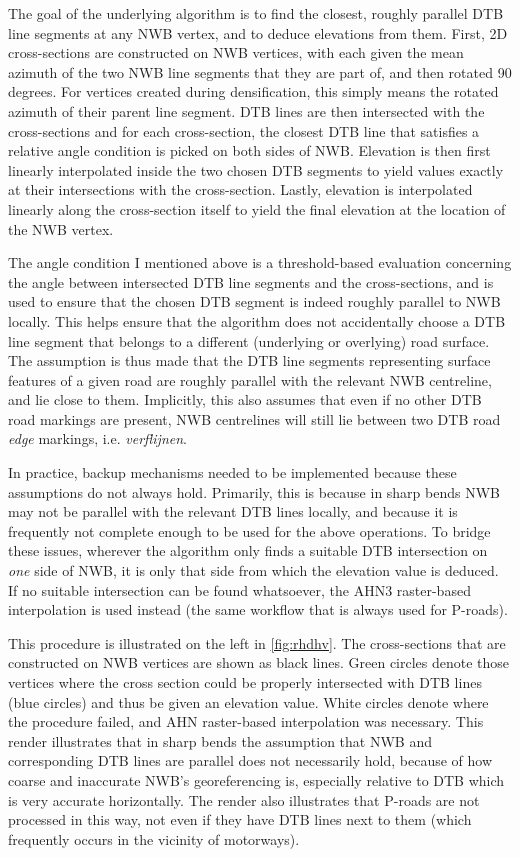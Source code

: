 The goal of the underlying algorithm is to find the closest, roughly parallel DTB line segments at any NWB vertex, and to deduce elevations from them. First, 2D cross-sections are constructed on NWB vertices, with each given the mean azimuth of the two NWB line segments that they are part of, and then rotated 90 degrees. For vertices created during densification, this simply means the rotated azimuth of their parent line segment. DTB lines are then intersected with the cross-sections and for each cross-section, the closest DTB line that satisfies a relative angle condition is picked on both sides of NWB. Elevation is then first linearly interpolated inside the two chosen DTB segments to yield values exactly at their intersections with the cross-section. Lastly, elevation is interpolated linearly along the cross-section itself to yield the final elevation at the location of the NWB vertex.

The angle condition I mentioned above is a threshold-based evaluation concerning the angle between intersected DTB line segments and the cross-sections, and is used to ensure that the chosen DTB segment is indeed roughly parallel to NWB locally. This helps ensure that the algorithm does not accidentally choose a DTB line segment that belongs to a different (underlying or overlying) road surface. The assumption is thus made that the DTB line segments representing surface features of a given road are roughly parallel with the relevant NWB centreline, and lie close to them. Implicitly, this also assumes that even if no other DTB road markings are present, NWB centrelines will still lie between two DTB road \textit{edge} markings, i.e. \textit{verflijnen}.

In practice, backup mechanisms needed to be implemented because these assumptions do not always hold. Primarily, this is because in sharp bends NWB may not be parallel with the relevant DTB lines locally, and because it is frequently not complete enough to be used for the above operations. To bridge these issues, wherever the algorithm only finds a suitable DTB intersection on \textit{one} side of NWB, it is only that side from which the elevation value is deduced. If no suitable intersection can be found whatsoever, the AHN3 raster-based interpolation is used instead (the same workflow that is always used for P-roads).

This procedure is illustrated on the left in \ref{fig:rhdhv}. The cross-sections that are constructed on NWB vertices are shown as black lines. Green circles denote those vertices where the cross section could be properly intersected with DTB lines (blue circles) and thus be given an elevation value. White circles denote where the procedure failed, and AHN raster-based interpolation was necessary. This render illustrates that in sharp bends the assumption that NWB and corresponding DTB lines are parallel does not necessarily hold, because of how coarse and inaccurate NWB's georeferencing is, especially relative to DTB which is very accurate horizontally. The render also illustrates that P-roads are not processed in this way, not even if they have DTB lines next to them (which frequently occurs in the vicinity of motorways).

